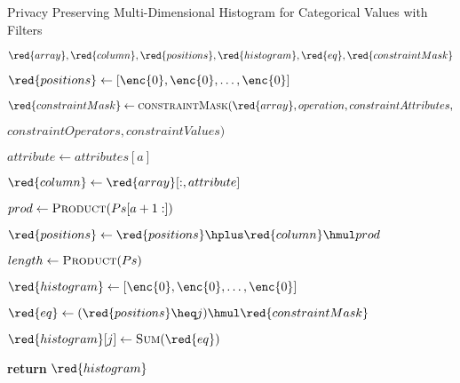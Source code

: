 \begin{algorithm}[H]
\caption{Privacy Preserving Multi-Dimensional Histogram for Categorical Values with Filters}\label{a:filters-2d-histogram}
\begin{algorithmic}[1]
  \renewcommand{\algorithmicrequire}{\textbf{Private Vars:}}
  \Require $\red{array}, \red{column}, \red{positions}, \red{histogram}, \red{eq}, \red{constraintMask}$


      \State
      $\red{positions} \gets [\enc{0}, \enc{0}, \dots, \enc{0}] $

      \State $\red{constraintMask} \gets \textsc{constraintMask}(\red{array}, operation, constraintAttributes, $\par\hfill$ constraintOperators, constraintValues)$


        \State $attribute \gets attributes[a]$

        \State $\red{column} \gets \red{array}[:, attribute]$ 

        \State $prod \gets \textsc{Product}(Ps[a+1:])$ 

        \State $\red{positions} \gets \red{positions} \hplus \red{column} \hmul prod$

      \EndFor

      \State $length \gets \textsc{Product}(Ps)$

      \State $\red{histogram} \gets [\enc{0}, \enc{0}, \dots, \enc{0}]$



        \State $\red{eq} \gets (\red{positions} \heq j) \hmul \red{constraintMask}$

        \State $\red{histogram}[j] \gets \textsc{Sum}(\red{eq})$

      \EndFor

      \State \textbf{return} {$\red{histogram}$}
  \EndProcedure

\end{algorithmic}
\end{algorithm}

